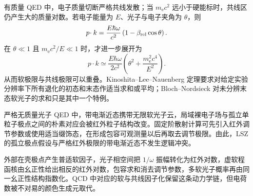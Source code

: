 有质量 QED 中，电子质量切断严格共线发散；当 $m_{\mathrm e} c^2$ 远小于硬能标时，共线区仍产生大的质量对数。若电子能量为 $E$、光子与电子夹角为 $\theta$，则
\begin{equation}
 {
 p\!\cdot k
 =\frac{E\hbar\omega}{c^2}
 \left(1-\beta_{\rm rel}\cos\theta\right).}
 \label{eq:soft-collinear-dot-exact-dp68}
\end{equation}
在 $\theta\ll1$ 且 $m_{\mathrm e} c^2/E\ll1$ 时，才进一步展开为
\begin{equation}
 {
 p\!\cdot k
 \simeq
 \frac{E\hbar\omega}{2c^2}
 \left(\theta^2+\frac{m_{\mathrm e}^2c^4}{E^2}\right).}
 \label{eq:soft-collinear-denominator-dp10}
\end{equation}
从而软极限与共线极限可以重叠。Kinoshita--Lee--Nauenberg 定理要求对给定实验分辨率下所有退化的初态和末态作适当求和或平均；Bloch--Nordsieck 对未分辨末态软光子的求和只是其中一个特例。

\begin{note}
严格无质量光子 QED 中，带电渐近态携带无限软光子云，局域裸电子场与孤立单粒子极点之间的朴素对应会被红外粒子结构改变。固定阶散射计算可先引入红外调节参数或使用适当缀饰态，在形成包容可观测量以后再取去调节极限。由此，LSZ 的孤立极点假设与严格红外极限的带电渐近态不发生逻辑冲突。
\end{note}

外部在壳极点产生普适软因子，光子相空间把 $1/\omega$ 振幅转化为红外对数，虚软程函核由幺正性给出相反的红外对数，包容求和消去调节参数，多软光子概率再由同一幺正性结构指数化。QCD 中对应的软与共线因子化保留这条动力学链，但电荷数被不对易的颜色生成元取代。

